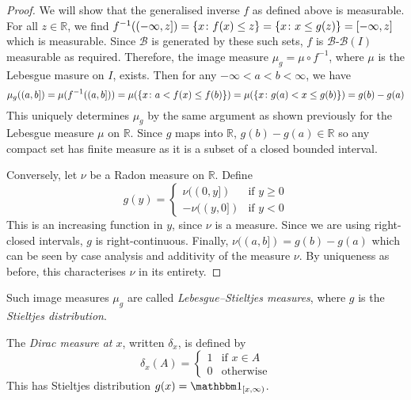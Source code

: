 \begin{proof}
	We will show that the generalised inverse \( f \) as defined above is measurable.
	For all \( z \in \mathbb R \), we find \( f^{-1}((-\infty,z]) = \qty{x \colon f(x) \leq z} = \qty{x \colon x \leq g(z)} = [-\infty,z] \) which is measurable.
	Since \( \mathcal B \) is generated by these such sets, \( f \) is \( \mathcal B \)-\(\mathcal B(I) \) measurable as required.
	Therefore, the image measure \( \mu_g = \mu \circ f^{-1} \), where \( \mu \) is the Lebesgue masure on \( I \), exists.
	Then for any \( -\infty < a < b < \infty \), we have
	\[ \mu_g((a,b]) = \mu(f^{-1}((a,b])) = \mu(\qty{x \colon a < f(x) \leq f(b)}) = \mu(\qty{x \colon g(a) < x \leq g(b)}) = g(b) - g(a) \]
	This uniquely determines \( \mu_g \) by the same argument as shown previously for the Lebesgue measure \( \mu \) on \( \mathbb R \).
	Since \( g \) maps into \( \mathbb R \), \( g(b) - g(a) \in \mathbb R \) so any compact set has finite measure as it is a subset of a closed bounded interval.

	Conversely, let \( \nu \) be a Radon measure on \( \mathbb R \).
	Define
	\[ g(y) = \begin{cases}
		\nu((0,y]) & \text{if } y \geq 0 \\
		-\nu((y,0]) & \text{if } y < 0
	\end{cases} \]
	This is an increasing function in \( y \), since \( \nu \) is a measure.
	Since we are using right-closed intervals, \( g \) is right-continuous.
	Finally, \( \nu((a,b]) = g(b) - g(a) \) which can be seen by case analysis and additivity of the measure \( \nu \).
	By uniqueness as before, this characterises \( \nu \) in its entirety.
\end{proof}
\begin{remark}
	Such image measures \( \mu_g \) are called \emph{Lebesgue--Stieltjes measures}, where \( g \) is the \emph{Stieltjes distribution}.
\end{remark}
\begin{example}
	The \emph{Dirac measure at \( x \)}, written \( \delta_x \), is defined by
	\[ \delta_x(A) = \begin{cases}
		1 & \text{if } x \in A \\
		0 & \text{otherwise}
	\end{cases} \]
	This has Stieltjes distribution \( g(x) = \mathbbm 1_{[x,\infty)} \).
\end{example}

